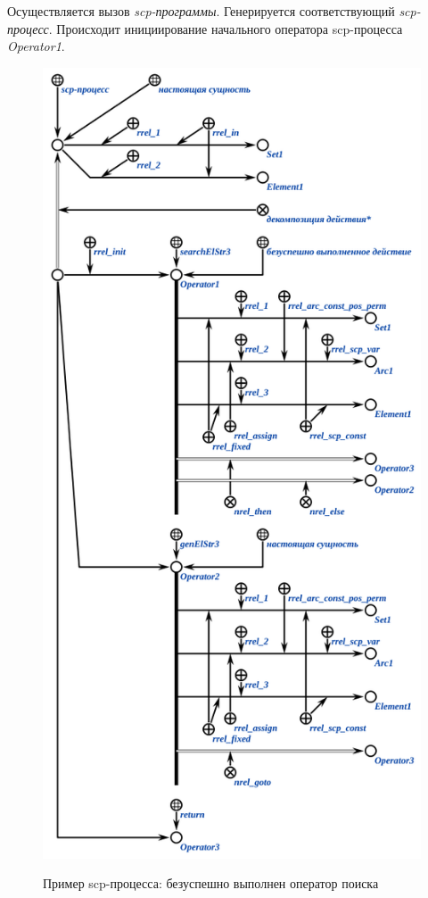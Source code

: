 Осуществляется вызов \textit{scp-программы}. Генерируется соответствующий \textit{scp-процесс}. Происходит инициирование начального оператора scp-процесса \textit{Operator1}.

\begin{figure}[H]
	\centering
	\caption{Пример scp-процесса: безуспешно выполнен оператор поиска}
	\includegraphics[scale=0.8]{images/part3/chapter_situation_management/process_example2.png}
	\label{fig:process_example2}
\end{figure}

